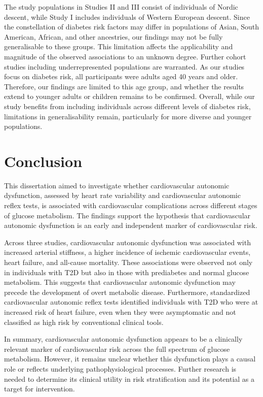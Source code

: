 \documentclass[
  a4paper,
  headsepline=true,
  open=any]{scrbook}
\begin{document}
The study populations in Studies II and III consist of individuals of
Nordic descent, while Study I includes individuals of Western European
descent. Since the constellation of diabetes risk factors may differ in
populations of Asian, South American, African, and other ancestries, our
findings may not be fully generalisable to these groups. This limitation
affects the applicability and magnitude of the observed associations to
an unknown degree. Further cohort studies including underrepresented
populations are warranted. As our studies focus on diabetes risk, all
participants were adults aged 40 years and older. Therefore, our
findings are limited to this age group, and whether the results extend
to younger adults or children remains to be confirmed. Overall, while
our study benefits from including individuals across different levels of
diabetes risk, limitations in generalisability remain, particularly for
more diverse and younger populations.


\hypertarget{conclusion}{%
\chapter{Conclusion}\label{conclusion}}

This dissertation aimed to investigate whether cardiovascular autonomic
dysfunction, assessed by heart rate variability and cardiovascular
autonomic reflex tests, is associated with cardiovascular complications
across different stages of glucose metabolism. The findings support the
hypothesis that cardiovascular autonomic dysfunction is an early and
independent marker of cardiovascular risk.

Across three studies, cardiovascular autonomic dysfunction was
associated with increased arterial stiffness, a higher incidence of
ischemic cardiovascular events, heart failure, and all-cause mortality.
These associations were observed not only in individuals with T2D but
also in those with prediabetes and normal glucose metabolism. This
suggests that cardiovascular autonomic dysfunction may precede the
development of overt metabolic disease. Furthermore, standardized
cardiovascular autonomic reflex tests identified individuals with T2D
who were at increased risk of heart failure, even when they were
asymptomatic and not classified as high risk by conventional clinical
tools.

In summary, cardiovascular autonomic dysfunction appears to be a
clinically relevant marker of cardiovascular risk across the full
spectrum of glucose metabolism. However, it remains unclear whether this
dysfunction plays a causal role or reflects underlying
pathophysiological processes. Further research is needed to determine
its clinical utility in risk stratification and its potential as a
target for intervention.
\end{document}
